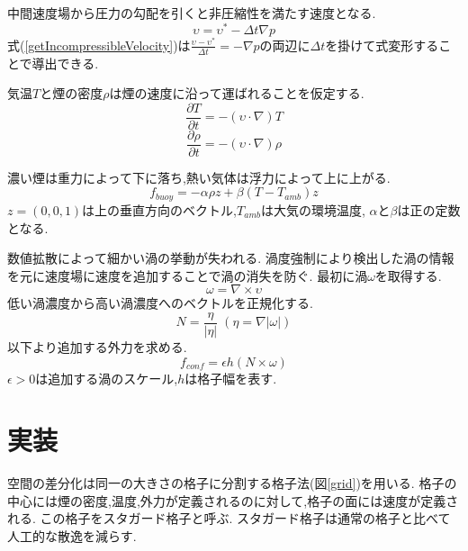 中間速度場から圧力の勾配を引くと非圧縮性を満たす速度となる.
\begin{equation}
\label{getIncompressibleVelocity}
\upsilon = \upsilon^* - \Delta t \nabla p
\end{equation}
式(\ref{getIncompressibleVelocity})は$\frac{\upsilon - \upsilon^* }{\Delta t} = - \nabla p$の両辺に$\Delta t$を掛けて式変形することで導出できる.

気温$T$と煙の密度$\rho$は煙の速度に沿って運ばれることを仮定する.
\begin{equation}
\label{temperature}
\frac{\partial T}{\partial t} = - ( \upsilon \cdot \nabla)T
\end{equation}
\begin{equation}
\label{temperature}
\frac{\partial \rho}{\partial t} = - ( \upsilon \cdot \nabla)\rho
\end{equation}

濃い煙は重力によって下に落ち,熱い気体は浮力によって上に上がる.
\begin{equation}
\label{buoyancy}
f_{buoy}=-\alpha\rho z + \beta(T-T_{amb}) z
\end{equation} 
$z=(0,0,1)$は上の垂直方向のベクトル,$T_{amb}$は大気の環境温度,
$\alpha$と$\beta$は正の定数となる.

数値拡散によって細かい渦の挙動が失われる.
渦度強制により検出した渦の情報を元に速度場に速度を追加することで渦の消失を防ぐ.
最初に渦$\omega$を取得する.
\begin{equation}
\label{volticity}
\omega=\nabla \times \upsilon
\end{equation}
低い渦濃度から高い渦濃度へのベクトルを正規化する.
\begin{equation}
\label{normalizeVelocityLocation}
N=\frac{\eta}{|\eta|}\;(\eta=\nabla|\omega|)
\end{equation}
以下より追加する外力を求める.
\begin{equation}
\label{confinementForce}
f_{conf}=\epsilon h (N \times \omega)
\end{equation}
$\epsilon > 0$は追加する渦のスケール,$h$は格子幅を表す.
\section{実装}

空間の差分化は同一の大きさの格子に分割する格子法(図\ref{grid})を用いる.
格子の中心には煙の密度,温度,外力が定義されるのに対して,格子の面には速度が定義される.
この格子をスタガード格子と呼ぶ.
スタガード格子は通常の格子と比べて人工的な散逸を減らす.


